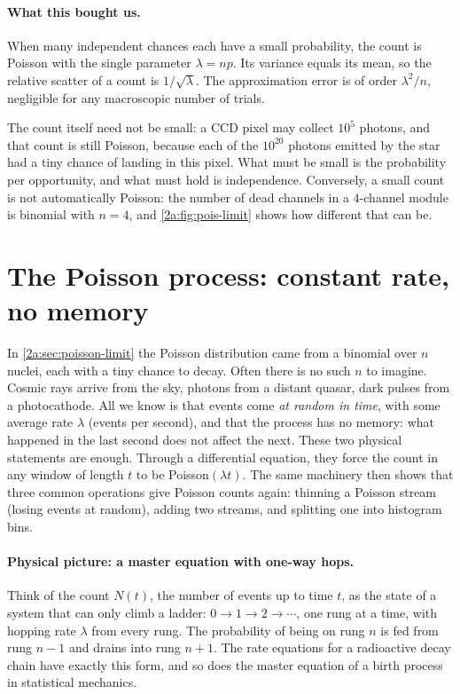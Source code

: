 \paragraph{What this bought us.}
When many independent chances each have a small probability, the count is Poisson with the single parameter $\lambda=np$. Its variance equals its mean, so the relative scatter of a count is $1/\sqrt\lambda$. The approximation error is of order $\lambda^2/n$, negligible for any macroscopic number of trials.

\begin{pitfall}
The count itself need not be small: a CCD pixel may collect $10^5$ photons, and that count is still Poisson, because each of the $10^{20}$ photons emitted by the star had a tiny chance of landing in this pixel. What must be small is the probability per opportunity, and what must hold is independence. Conversely, a small count is not automatically Poisson: the number of dead channels in a $4$-channel module is binomial with $n=4$, and \cref{2a:fig:pois-limit} shows how different that can be.
\end{pitfall}

\section{The Poisson process: constant rate, no memory}\label{2a:sec:poisson-process}

In \cref{2a:sec:poisson-limit} the Poisson distribution came from a binomial over $n$ nuclei, each with a tiny chance to decay. Often there is no such $n$ to imagine. Cosmic rays arrive from the sky, photons from a distant quasar, dark pulses from a photocathode. All we know is that events come \emph{at random in time}, with some average rate $\lambda$ (events per second), and that the process has no memory: what happened in the last second does not affect the next. These two physical statements are enough. Through a differential equation, they force the count in any window of length $t$ to be Poisson$(\lambda t)$. The same machinery then shows that three common operations give Poisson counts again: thinning a Poisson stream (losing events at random), adding two streams, and splitting one into histogram bins.

\paragraph{Physical picture: a master equation with one-way hops.}
Think of the count $N(t)$, the number of events up to time $t$, as the state of a system that can only climb a ladder: $0\to1\to2\to\cdots$, one rung at a time, with hopping rate $\lambda$ from every rung. The probability of being on rung $n$ is fed from rung $n-1$ and drains into rung $n+1$. The rate equations for a radioactive decay chain have exactly this form, and so does the master equation of a birth process in statistical mechanics.

